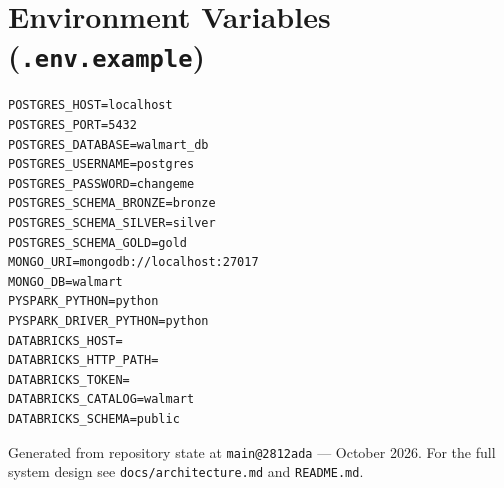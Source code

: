 \documentclass[11pt,a4paper]{article}
\begin{document}
\section{Environment Variables (\texttt{.env.example})}
\begin{lstlisting}[style=bash]
POSTGRES_HOST=localhost
POSTGRES_PORT=5432
POSTGRES_DATABASE=walmart_db
POSTGRES_USERNAME=postgres
POSTGRES_PASSWORD=changeme
POSTGRES_SCHEMA_BRONZE=bronze
POSTGRES_SCHEMA_SILVER=silver
POSTGRES_SCHEMA_GOLD=gold
MONGO_URI=mongodb://localhost:27017
MONGO_DB=walmart
PYSPARK_PYTHON=python
PYSPARK_DRIVER_PYTHON=python
DATABRICKS_HOST=
DATABRICKS_HTTP_PATH=
DATABRICKS_TOKEN=
DATABRICKS_CATALOG=walmart
DATABRICKS_SCHEMA=public
\end{lstlisting}

\vfill
\begin{center}
\small\textcolor{muted}{Generated from repository state at \texttt{main@2812ada} — October 2026. For the full system design see \texttt{docs/architecture.md} and \texttt{README.md}.}
\end{center}
\end{document}
